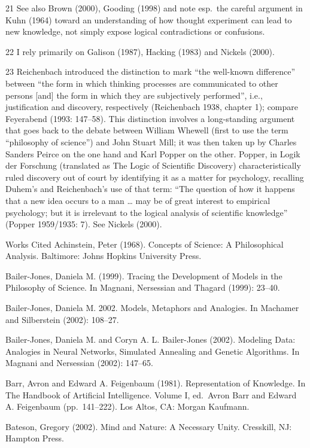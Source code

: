 21 See also Brown (2000), Gooding (1998) and note esp.~the careful
argument in Kuhn (1964) toward an understanding of how thought
experiment can lead to new knowledge, not simply expose logical
contradictions or confusions.

22 I rely primarily on Galison (1987), Hacking (1983) and Nickels
(2000).

23 Reichenbach introduced the distinction to mark ``the well-known
difference'' between ``the form in which thinking processes are
communicated to other persons {[}and{]} the form in which they are
subjectively performed'', i.e., justification and discovery,
respectively (Reichenbach 1938, chapter 1); compare Feyerabend (1993:
147--58). This distinction involves a long-standing argument that goes
back to the debate between William Whewell (first to use the term
``philosophy of science'') and John Stuart Mill; it was then taken up by
Charles Sanders Peirce on the one hand and Karl Popper on the other.
Popper, in Logik der Forschung (translated as The Logic of Scientific
Discovery) characteristically ruled discovery out of court by
identifying it as a matter for psychology, recalling Duhem's and
Reichenbach's use of that term: ``The question of how it happens that a
new idea occurs to a man \ldots{} may be of great interest to empirical
psychology; but it is irrelevant to the logical analysis of scientific
knowledge'' (Popper 1959/1935: 7). See Nickels (2000).

Works Cited Achinstein, Peter (1968). Concepts of Science: A
Philosophical Analysis. Baltimore: Johns Hopkins University Press.

Bailer-Jones, Daniela M. (1999). Tracing the Development of Models in
the Philosophy of Science. In Magnani, Nersessian and Thagard (1999):
23--40.

Bailer-Jones, Daniela M. 2002. Models, Metaphors and Analogies. In
Machamer and Silberstein (2002): 108--27.

Bailer-Jones, Daniela M. and Coryn A. L. Bailer-Jones (2002). Modeling
Data: Analogies in Neural Networks, Simulated Annealing and Genetic
Algorithms. In Magnani and Nersessian (2002): 147--65.

Barr, Avron and Edward A. Feigenbaum (1981). Representation of
Knowledge. In The Handbook of Artificial Intelligence. Volume I,
ed.~Avron Barr and Edward A. Feigenbaum (pp.~141--222). Los Altos, CA:
Morgan Kaufmann.

Bateson, Gregory (2002). Mind and Nature: A Necessary Unity. Cresskill,
NJ: Hampton Press.

